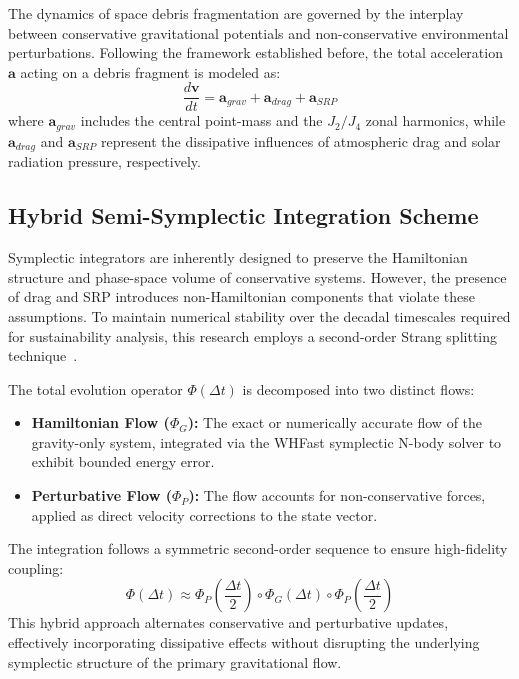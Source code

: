 \documentclass[letterpaper, preprint, 11pt]{AAS}
\begin{document}
The dynamics of space debris fragmentation are governed by the interplay between conservative gravitational potentials and non-conservative environmental perturbations. Following the framework established before, the total acceleration $\mathbf{a}$ acting on a debris fragment is modeled as:
\begin{equation}
    \frac{d\mathbf{v}}{dt} = \mathbf{a}_{grav} + \mathbf{a}_{drag} + \mathbf{a}_{SRP}
\end{equation}
where $\mathbf{a}_{grav}$ includes the central point-mass and the $J_2/J_4$ zonal harmonics, while $\mathbf{a}_{drag}$ and $\mathbf{a}_{SRP}$ represent the dissipative influences of atmospheric drag and solar radiation pressure, respectively.

\subsection{Hybrid Semi-Symplectic Integration Scheme}
Symplectic integrators are inherently designed to preserve the Hamiltonian structure and phase-space volume of conservative systems. However, the presence of drag and SRP introduces non-Hamiltonian components that violate these assumptions. To maintain numerical stability over the decadal timescales required for sustainability analysis, this research employs a second-order Strang splitting technique~\cite{puerta-ibarra_advanced_2025}.

The total evolution operator $\Phi(\Delta t)$ is decomposed into two distinct flows:
\begin{itemize}
    \item \textbf{Hamiltonian Flow ($\Phi_G$):} The exact or numerically accurate flow of the gravity-only system, integrated via the WHFast symplectic N-body solver to exhibit bounded energy error.
    \item \textbf{Perturbative Flow ($\Phi_P$):} The flow accounts for non-conservative forces, applied as direct velocity corrections to the state vector.
\end{itemize}

The integration follows a symmetric second-order sequence to ensure high-fidelity coupling:
\begin{equation}
    \Phi(\Delta t) \approx \Phi_{P}\left(\frac{\Delta t}{2}\right) \circ \Phi_{G}(\Delta t) \circ \Phi_{P}\left(\frac{\Delta t}{2}\right)
\end{equation}
This hybrid approach alternates conservative and perturbative updates, effectively incorporating dissipative effects without disrupting the underlying symplectic structure of the primary gravitational flow.
\end{document}
